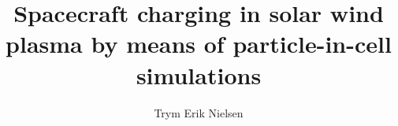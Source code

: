 \documentclass[a4paper, american]{memoir}
\title{Spacecraft charging in solar wind plasma by means of particle-in-cell simulations}
\author{Trym Erik Nielsen}
\begin{document}
    \frontmatter        %

    \masterfrontpage

    
    

    \cleartorecto
    \tableofcontents    %
    \cleartorecto
    \listoffigures      %
    \cleartorecto
    \listoftables       %

    \mainmatter         %

    
    
    
    
    
    
    

    \appendix           %
    \appendixpage       %

    
    

    \backmatter         %

    \printbibliography
\end{document}
